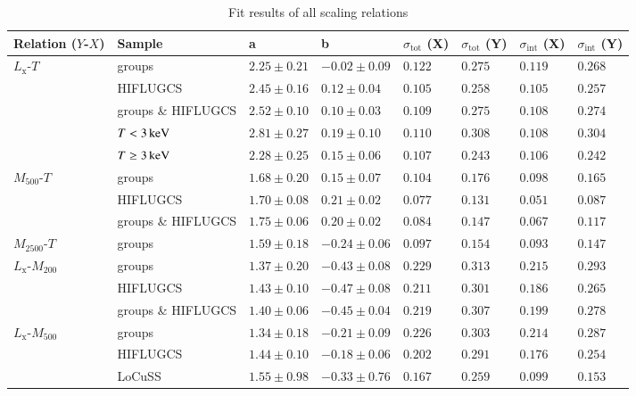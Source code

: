 \documentclass[structabstract]{aa}
\begin{document}
\begin{table}
\begin{threeparttable}
\caption{Fit results of all scaling relations}
\begin{center}
\setlength\extrarowheight{2pt}
\begin{tabularx}{\linewidth}{X X XXllll}
\hline\hline
Relation ($Y$-$X$) & Sample & a & b & $\sigma_{\text{tot}}$ (X) & $\sigma_{\text{tot}}$ (Y) & $\sigma_{\text{int}}$ (X) & $\sigma_{\text{int}}$ (Y) \\ \hline
$L_{\text{x}}$-$T$ & groups & $2.25 \pm 0.21$ & $-0.02 \pm 0.09$ & $0.122$ & $0.275$ & $0.119$ & $0.268$ \\ 
 & HIFLUGCS & $2.45 \pm 0.16$ & $0.12 \pm 0.04$ & $0.105$ & $0.258$ & $0.105$ & $0.257$ \\ 
 & groups \& HIFLUGCS & $2.52 \pm 0.10$ & $0.10 \pm 0.03$ & $0.109$ & $0.275$ & $0.108$ & $0.274$ \\ 
 & $T<\unit[3]{keV}$ & $2.81 \pm 0.27$ & $0.19 \pm 0.10$ & $0.110$ & $0.308$ & $0.108$ & $0.304$ \\ 
 & $T\geq\unit[3]{keV}$ & $2.28 \pm 0.25$ & $0.15 \pm 0.06$ & $0.107$ & $0.243$ & $0.106$ & $0.242$ \\ \hline
$M_{500}$-$T$ & groups & $1.68 \pm 0.20$ & $0.15 \pm 0.07$ & $0.104$ & $0.176$ & $0.098$ & $0.165$ \\ 
 & HIFLUGCS & $1.70 \pm 0.08$ & $0.21 \pm 0.02$ & $0.077$ & $0.131$ & $0.051$ & $0.087$ \\ 
 & groups \& HIFLUGCS & $1.75 \pm 0.06$ & $0.20 \pm 0.02$ & $0.084$ & $0.147$ & $0.067$ & $0.117$ \\ 
$M_{2500}$-$T$ & groups & $1.59 \pm 0.18$ & $-0.24 \pm 0.06$ & $0.097$ & $0.154$ & $0.093$ & $0.147$ \\ \hline
$L_{\text{x}}$-$M_{200}$ & groups & $1.37 \pm 0.20$ & $-0.43 \pm 0.08$ & $0.229$ & $0.313$ & $0.215$ & $0.293$ \\ 
 & HIFLUGCS & $1.43 \pm 0.10$ & $-0.47 \pm 0.08$ & $0.211$ & $0.301$ & $0.186$ & $0.265$ \\ 
 & groups \& HIFLUGCS & $1.40 \pm 0.06$ & $-0.45 \pm 0.04$ & $0.219$ & $0.307$ & $0.199$ & $0.278$ \\ 
$L_{\text{x}}$-$M_{500}$ & groups & $1.34 \pm 0.18$ & $-0.21 \pm 0.09$ & $0.226$ & $0.303$ & $0.214$ & $0.287$ \\ 
 & HIFLUGCS & $1.44 \pm 0.10$ & $-0.18 \pm 0.06$ & $0.202$ & $0.291$ & $0.176$ & $0.254$ \\ 
 & LoCuSS & $1.55 \pm 0.98$ & $-0.33 \pm 0.76$ & $0.167$ & $0.259$ & $0.099$ & $0.153$ \\ 

\end{tabularx}
\end{center}
\end{threeparttable}
\end{table}
\end{document}
